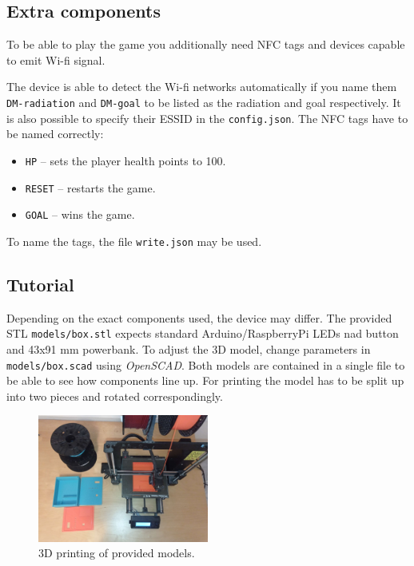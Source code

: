 \documentclass{article}
\begin{document}
\subsection{Extra components}
To be able to play the game you additionally need NFC tags and devices capable to emit Wi-fi signal.

The device is able to detect the Wi-fi networks automatically if you name them \texttt{DM-radiation} and \texttt{DM-goal} to be listed as the radiation and goal respectively. 
It is also possible to specify their ESSID in the \texttt{config.json}.
The NFC tags have to be named correctly:
\begin{itemize}
    \item \texttt{HP} -- sets the player health points to 100.
    \item \texttt{RESET} -- restarts the game.
    \item \texttt{GOAL} -- wins the game.
\end{itemize}
To name the tags, the file \texttt{write.json} may be used.

\subsection{Tutorial}
    Depending on the exact components used, the device may differ.
    The provided STL \texttt{models/box.stl} expects standard Arduino/RaspberryPi LEDs nad button and 43x91 mm powerbank.
    To adjust the 3D model, change parameters in \texttt{models/box.scad} using \emph{OpenSCAD}.
    Both models are contained in a single file to be able to see how components line up.
    For printing the model has to be split up into two pieces and rotated correspondingly. 

\begin{figure}[ht]
    \centering
    \includegraphics[width=0.5\textwidth]{imgs/Printing.jpg}
    \caption{3D printing of provided models.}
\end{figure}
\end{document}
